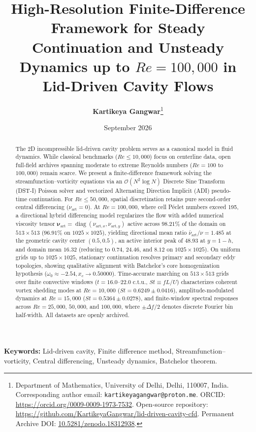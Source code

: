 \documentclass[11pt,a4paper]{article}
\title{\LARGE \textbf{High-Resolution Finite-Difference Framework for Steady Continuation and Unsteady Dynamics up to $Re = 100{,}000$ in Lid-Driven Cavity Flows}}
\author{\textbf{Kartikeya Gangwar}\thanks{Department of Mathematics, University of Delhi, Delhi, 110007, India. Corresponding author email: \texttt{kartikeyagangwar@proton.me}. ORCID: \url{https://orcid.org/0009-0009-1973-7532}. Open-source repository: \url{https://github.com/KartikeyaGangwar/lid-driven-cavity-cfd}. Permanent Archive DOI: \href{https://doi.org/10.5281/zenodo.18312938}{10.5281/zenodo.18312938}.}}
\date{September 2026}
\begin{document}
\maketitle

\begin{abstract}
The 2D incompressible lid-driven cavity problem serves as a canonical model in fluid dynamics. While classical benchmarks ($Re \le 10{,}000$) focus on centerline data, open full-field archives spanning moderate to extreme Reynolds numbers ($Re = 100$ to $100{,}000$) remain scarce. We present a finite-difference framework solving the streamfunction--vorticity equations via an $\mathcal{O}(N^2 \log N)$ Discrete Sine Transform (DST-I) Poisson solver and vectorized Alternating Direction Implicit (ADI) pseudo-time continuation. For $Re \le 50{,}000$, spatial discretization retains pure second-order central differencing ($\nu_{\mathrm{art}} = 0$). At $Re = 100{,}000$, where cell P\'eclet numbers exceed 195, a directional hybrid differencing model regularizes the flow with added numerical viscosity tensor $\boldsymbol{\nu}_{\mathrm{art}} = \operatorname{diag}(\nu_{\mathrm{art},x}, \nu_{\mathrm{art},y})$ active across $98.21\%$ of the domain on $513 \times 513$ ($96.91\%$ on $1025 \times 1025$), yielding directional mean ratio $\bar{\nu}_{\mathrm{art}}/\nu = 1.485$ at the geometric cavity center $(0.5, 0.5)$, an active interior peak of $48.93$ at $y = 1-h$, and domain mean $16.32$ (reducing to $0.74$, $24.46$, and $8.12$ on $1025 \times 1025$). On uniform grids up to $1025 \times 1025$, stationary continuation resolves primary and secondary eddy topologies, showing qualitative alignment with Batchelor's core homogenization hypothesis ($\omega_0 \approx -2.54, x_c \to 0.50000$). Time-accurate marching on $513 \times 513$ grids over finite convective windows ($t = 16.0$--$22.0$ c.t.u., $St \equiv f L / U$) characterizes coherent vortex shedding modes at $Re = 10{,}000$ ($St = 0.6249 \pm 0.0416$), amplitude-modulated dynamics at $Re = 15{,}000$ ($St = 0.5364 \pm 0.0278$), and finite-window spectral responses across $Re = 25{,}000$, $50{,}000$, and $100{,}000$, where $\pm \Delta f / 2$ denotes discrete Fourier bin half-width. All datasets are openly archived.
\end{abstract}

\vspace{0.5em}
\noindent \textbf{Keywords:} Lid-driven cavity, Finite difference method, Streamfunction--vorticity, Central differencing, Unsteady dynamics, Batchelor theorem.
\end{document}
